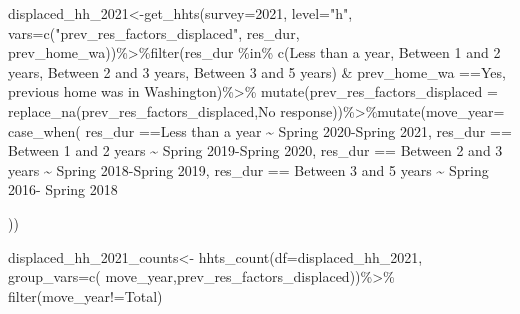 \documentclass[
]{article}
\newenvironment{Shaded}{\begin{snugshade}}{\end{snugshade}}
\newcommand{\AttributeTok}[1]{\textcolor[rgb]{0.77,0.63,0.00}{#1}}
\newcommand{\FunctionTok}[1]{\textcolor[rgb]{0.00,0.00,0.00}{#1}}
\newcommand{\NormalTok}[1]{#1}
\newcommand{\OtherTok}[1]{\textcolor[rgb]{0.56,0.35,0.01}{#1}}
\newcommand{\SpecialCharTok}[1]{\textcolor[rgb]{0.00,0.00,0.00}{#1}}
\newcommand{\StringTok}[1]{\textcolor[rgb]{0.31,0.60,0.02}{#1}}
\begin{document}
\begin{Shaded}
\begin{Highlighting}[]
\NormalTok{displaced\_hh\_2021}\OtherTok{\textless{}{-}}\FunctionTok{get\_hhts}\NormalTok{(}\AttributeTok{survey=}\StringTok{\textquotesingle{}2021\textquotesingle{}}\NormalTok{, }\AttributeTok{level=}\StringTok{"h"}\NormalTok{, }\AttributeTok{vars=}\FunctionTok{c}\NormalTok{(}\StringTok{"prev\_res\_factors\_displaced"}\NormalTok{, }\StringTok{\textquotesingle{}res\_dur\textquotesingle{}}\NormalTok{, }\StringTok{\textquotesingle{}prev\_home\_wa\textquotesingle{}}\NormalTok{))}\SpecialCharTok{\%\textgreater{}\%}\FunctionTok{filter}\NormalTok{(res\_dur }\SpecialCharTok{\%in\%} \FunctionTok{c}\NormalTok{(}\StringTok{\textquotesingle{}Less than a year\textquotesingle{}}\NormalTok{, }\StringTok{\textquotesingle{}Between 1 and 2 years\textquotesingle{}}\NormalTok{, }\StringTok{\textquotesingle{}Between 2 and 3 years\textquotesingle{}}\NormalTok{,    }\StringTok{\textquotesingle{}Between 3 and 5 years\textquotesingle{}}\NormalTok{) }\SpecialCharTok{\&}\NormalTok{ prev\_home\_wa }\SpecialCharTok{==}\StringTok{\textquotesingle{}Yes, previous home was in Washington\textquotesingle{}}\NormalTok{)}\SpecialCharTok{\%\textgreater{}\%} \FunctionTok{mutate}\NormalTok{(}\AttributeTok{prev\_res\_factors\_displaced =} \FunctionTok{replace\_na}\NormalTok{(prev\_res\_factors\_displaced,}\StringTok{\textquotesingle{}No response\textquotesingle{}}\NormalTok{))}\SpecialCharTok{\%\textgreater{}\%}\FunctionTok{mutate}\NormalTok{(}\AttributeTok{move\_year=} \FunctionTok{case\_when}\NormalTok{(}
\NormalTok{  res\_dur }\SpecialCharTok{==}\StringTok{\textquotesingle{}Less than a year\textquotesingle{}} \SpecialCharTok{\textasciitilde{}} \StringTok{\textquotesingle{}Spring 2020{-}Spring 2021\textquotesingle{}}\NormalTok{,}
\NormalTok{  res\_dur }\SpecialCharTok{==} \StringTok{\textquotesingle{}Between 1 and 2 years\textquotesingle{}} \SpecialCharTok{\textasciitilde{}} \StringTok{\textquotesingle{}Spring 2019{-}Spring 2020\textquotesingle{}}\NormalTok{,}
\NormalTok{  res\_dur }\SpecialCharTok{==} \StringTok{\textquotesingle{}Between 2 and 3 years\textquotesingle{}} \SpecialCharTok{\textasciitilde{}} \StringTok{\textquotesingle{}Spring 2018{-}Spring 2019\textquotesingle{}}\NormalTok{,}
\NormalTok{  res\_dur }\SpecialCharTok{==} \StringTok{\textquotesingle{}Between 3 and 5 years\textquotesingle{}} \SpecialCharTok{\textasciitilde{}} \StringTok{\textquotesingle{}Spring 2016{-} Spring 2018\textquotesingle{}}
  
\NormalTok{))}

\NormalTok{displaced\_hh\_2021\_counts}\OtherTok{\textless{}{-}} \FunctionTok{hhts\_count}\NormalTok{(}\AttributeTok{df=}\NormalTok{displaced\_hh\_2021, }\AttributeTok{group\_vars=}\FunctionTok{c}\NormalTok{( }\StringTok{\textquotesingle{}move\_year\textquotesingle{}}\NormalTok{,}\StringTok{\textquotesingle{}prev\_res\_factors\_displaced\textquotesingle{}}\NormalTok{))}\SpecialCharTok{\%\textgreater{}\%}
\FunctionTok{filter}\NormalTok{(move\_year}\SpecialCharTok{!=}\StringTok{\textquotesingle{}Total\textquotesingle{}}\NormalTok{)}


\end{Highlighting}
\end{Shaded}
\end{document}
